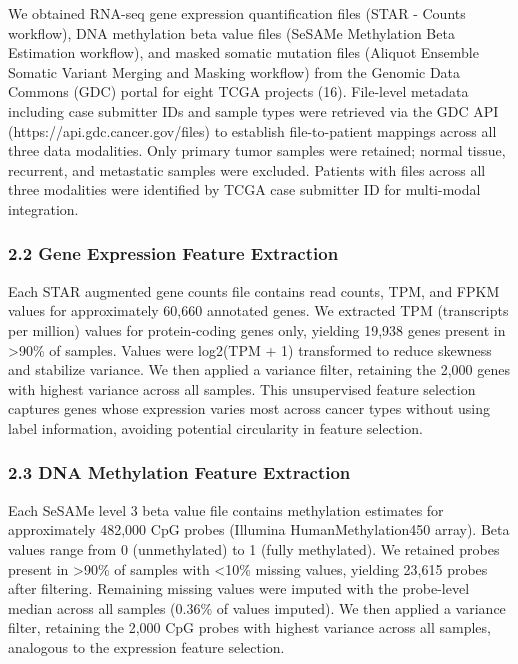We obtained RNA-seq gene expression quantification files (STAR - Counts
workflow), DNA methylation beta value files (SeSAMe Methylation Beta
Estimation workflow), and masked somatic mutation files (Aliquot
Ensemble Somatic Variant Merging and Masking workflow) from the Genomic
Data Commons (GDC) portal for eight TCGA projects (16). File-level
metadata including case submitter IDs and sample types were retrieved
via the GDC API (https://api.gdc.cancer.gov/files) to establish
file-to-patient mappings across all three data modalities. Only primary
tumor samples were retained; normal tissue, recurrent, and metastatic
samples were excluded. Patients with files across all three modalities
were identified by TCGA case submitter ID for multi-modal integration.

\subsubsection{2.2 Gene Expression Feature
Extraction}\label{gene-expression-feature-extraction}

Each STAR augmented gene counts file contains read counts, TPM, and FPKM
values for approximately 60,660 annotated genes. We extracted TPM
(transcripts per million) values for protein-coding genes only, yielding
19,938 genes present in \textgreater90\% of samples. Values were
log2(TPM + 1) transformed to reduce skewness and stabilize variance. We
then applied a variance filter, retaining the 2,000 genes with highest
variance across all samples. This unsupervised feature selection
captures genes whose expression varies most across cancer types without
using label information, avoiding potential circularity in feature
selection.

\subsubsection{2.3 DNA Methylation Feature
Extraction}\label{dna-methylation-feature-extraction}

Each SeSAMe level 3 beta value file contains methylation estimates for
approximately 482,000 CpG probes (Illumina HumanMethylation450 array).
Beta values range from 0 (unmethylated) to 1 (fully methylated). We
retained probes present in \textgreater90\% of samples with
\textless10\% missing values, yielding 23,615 probes after filtering.
Remaining missing values were imputed with the probe-level median across
all samples (0.36\% of values imputed). We then applied a variance
filter, retaining the 2,000 CpG probes with highest variance across all
samples, analogous to the expression feature selection.

